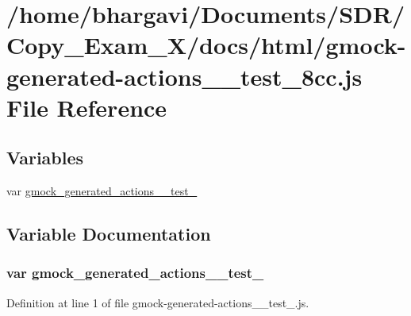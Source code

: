 \hypertarget{gmock-generated-actions____test__8cc_8js}{}\section{/home/bhargavi/\+Documents/\+S\+D\+R/\+Copy\+\_\+\+Exam\+\_\+X/docs/html/gmock-\/generated-\/actions\+\_\+\+\_\+test\+\_\+8cc.js File Reference}
\label{gmock-generated-actions____test__8cc_8js}
\subsection*{Variables}
\begin{DoxyCompactItemize}
\item 
var \hyperlink{gmock-generated-actions____test__8cc_8js_a78405f5c920833f28f76bd556dbfbe6b}{gmock\+\_\+generated\+\_\+actions\+\_\+\+\_\+test\+\_}
\end{DoxyCompactItemize}


\subsection{Variable Documentation}
\subsubsection[{\texorpdfstring{gmock\+\_\+generated\+\_\+actions\+\_\+\+\_\+test\+\_\+8cc}{gmock_generated_actions__test_8cc}}]{\setlength{\rightskip}{0pt plus 5cm}var gmock\+\_\+generated\+\_\+actions\+\_\+\+\_\+test\+\_}\hypertarget{gmock-generated-actions____test__8cc_8js_a78405f5c920833f28f76bd556dbfbe6b}{}\label{gmock-generated-actions____test__8cc_8js_a78405f5c920833f28f76bd556dbfbe6b}


Definition at line 1 of file gmock-\/generated-\/actions\+\_\+\+\_\+test\+\_.\+js.

